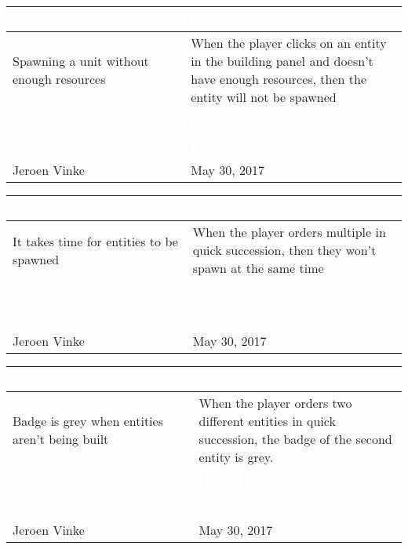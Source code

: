 \begin{tabularx}{\textwidth}{|X|X|}
\hline
\rowcolor{lightgray}\textcolor{white}{\textbf{Test scenario}} &
\textcolor{white}{\textbf{Desired result}}       
\\\hline
Spawning a unit without enough resources & When the player clicks on an entity in the building panel and doesn't have enough resources, then the entity will not be spawned
\\\hline
\rowcolor{lightgray}\textcolor{white}{\textbf{Comments/suggestions}} & 
\textcolor{white}{\textbf{Passed}}
\\\hline
 & \cellcolor{green}                       
\\\hline
\rowcolor{lightgray}\textcolor{white}{\textbf{Tester}} & 
\textcolor{white}{\textbf{Date}}               
\\\hline
Jeroen Vinke & May 30, 2017     
                          		 
\\\hline
\end{tabularx}


\begin{tabularx}{\textwidth}{|X|X|}
\hline
\rowcolor{lightgray}\textcolor{white}{\textbf{Test scenario}} &
\textcolor{white}{\textbf{Desired result}}       
\\\hline
It takes time for entities to be spawned & When the player orders multiple in quick succession, then they won't spawn at the same time
\\\hline
\rowcolor{lightgray}\textcolor{white}{\textbf{Comments/suggestions}} & 
\textcolor{white}{\textbf{Passed}}
\\\hline
 & \cellcolor{green}                       
\\\hline
\rowcolor{lightgray}\textcolor{white}{\textbf{Tester}} & 
\textcolor{white}{\textbf{Date}}               
\\\hline
Jeroen Vinke & May 30, 2017     
                          		 
\\\hline
\end{tabularx}


\begin{tabularx}{\textwidth}{|X|X|}
\hline
\rowcolor{lightgray}\textcolor{white}{\textbf{Test scenario}} &
\textcolor{white}{\textbf{Desired result}}       
\\\hline
Badge is grey when entities aren't being built & When the player orders two different entities in quick succession, the badge of the second entity is grey.
\\\hline
\rowcolor{lightgray}\textcolor{white}{\textbf{Comments/suggestions}} & 
\textcolor{white}{\textbf{Passed}}
\\\hline
 & \cellcolor{green}                       
\\\hline
\rowcolor{lightgray}\textcolor{white}{\textbf{Tester}} & 
\textcolor{white}{\textbf{Date}}               
\\\hline
Jeroen Vinke & May 30, 2017     
                          		 
\\\hline
\end{tabularx}


